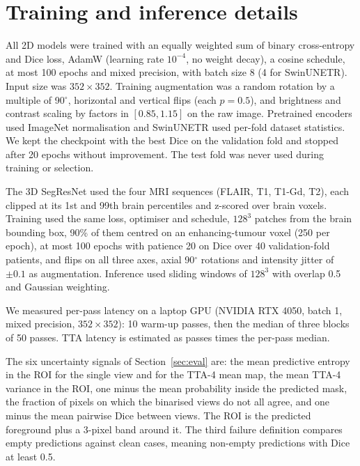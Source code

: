 
\section{Training and inference details}
\label{app:training}
All 2D models were trained with an equally weighted sum of binary cross-entropy and Dice loss, AdamW (learning rate $10^{-4}$, no weight decay), a cosine schedule, at most 100 epochs and mixed precision, with batch size 8 (4 for SwinUNETR). Input size was $352\times352$. Training augmentation was a random rotation by a multiple of 90$^\circ$, horizontal and vertical flips (each $p=0.5$), and brightness and contrast scaling by factors in $[0.85, 1.15]$ on the raw image. Pretrained encoders used ImageNet normalisation and SwinUNETR used per-fold dataset statistics. We kept the checkpoint with the best Dice on the validation fold and stopped after 20 epochs without improvement. The test fold was never used during training or selection.

The 3D SegResNet used the four MRI sequences (FLAIR, T1, T1-Gd, T2), each clipped at its 1st and 99th brain percentiles and z-scored over brain voxels. Training used the same loss, optimiser and schedule, $128^3$ patches from the brain bounding box, 90\% of them centred on an enhancing-tumour voxel (250 per epoch), at most 100 epochs with patience 20 on Dice over 40 validation-fold patients, and flips on all three axes, axial 90$^\circ$ rotations and intensity jitter of $\pm0.1$ as augmentation. Inference used sliding windows of $128^3$ with overlap 0.5 and Gaussian weighting.

We measured per-pass latency on a laptop GPU (NVIDIA RTX 4050, batch 1, mixed precision, $352\times352$): 10 warm-up passes, then the median of three blocks of 50 passes. TTA latency is estimated as passes times the per-pass median.


The six uncertainty signals of Section~\ref{sec:eval} are: the mean predictive entropy in the ROI for the single view and for the TTA-4 mean map, the mean TTA-4 variance in the ROI, one minus the mean probability inside the predicted mask, the fraction of pixels on which the binarised views do not all agree, and one minus the mean pairwise Dice between views. The ROI is the predicted foreground plus a 3-pixel band around it. The third failure definition compares empty predictions against clean cases, meaning non-empty predictions with Dice at least 0.5.

